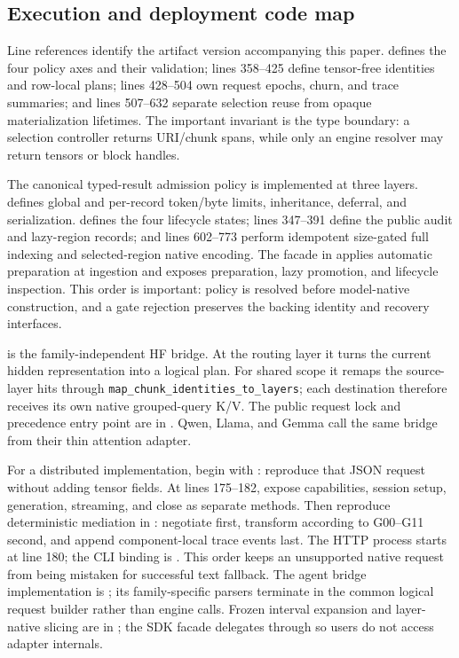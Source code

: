 \documentclass[11pt]{article}
\begin{document}
\subsection{Execution and deployment code map}

Line references identify the artifact version accompanying this paper.
 defines the four policy axes and
their validation; lines 358--425 define tensor-free identities and row-local
plans; lines 428--504 own request epochs, churn, and trace summaries; and lines
507--632 separate selection reuse from opaque materialization lifetimes.
The important invariant is the type boundary: a selection controller returns
URI/chunk spans, while only an engine resolver may return tensors or block
handles.

The canonical typed-result admission policy is implemented at three layers.
 defines global and
per-record token/byte limits, inheritance, deferral, and serialization.
 defines the four lifecycle
states; lines 347--391 define the public audit and lazy-region records; and
lines 602--773 perform idempotent size-gated full indexing and selected-region
native encoding. The facade in
 applies automatic preparation at
ingestion and exposes preparation, lazy promotion, and lifecycle inspection.
This order is important: policy is resolved before model-native construction,
and a gate rejection preserves the backing identity and recovery interfaces.

 is the family-independent HF
bridge. At the routing layer it turns the current hidden representation into a
logical plan. For shared scope it remaps the source-layer hits through
\texttt{map\_chunk\_identities\_to\_layers}; each destination therefore receives
its own native grouped-query K/V. The public request lock and precedence entry
point are in . Qwen, Llama, and Gemma call
the same bridge from their thin attention adapter.

For a distributed implementation, begin with
: reproduce that JSON request without
adding tensor fields. At lines 175--182, expose capabilities, session setup,
generation, streaming, and close as separate methods. Then reproduce deterministic mediation in
: negotiate first, transform according to
G00--G11 second, and append component-local trace events last. The HTTP process
starts at line 180; the CLI binding is
. This order keeps an unsupported
native request from being mistaken for successful text fallback.
The agent bridge implementation is
; its family-specific parsers terminate
in the common logical request builder rather than engine calls. Frozen interval
expansion and layer-native slicing are in
; the SDK facade delegates through
 so users do not access adapter internals.
\end{document}
